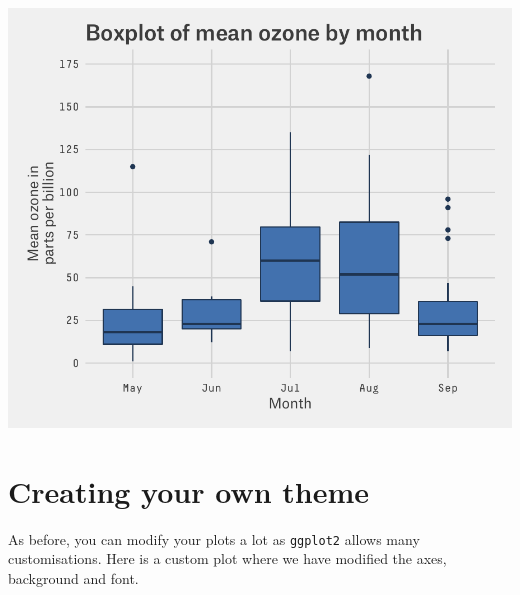 \documentclass[]{article}
\begin{document}
\begin{center}\includegraphics{10_Boxplots_pdf/box_13-1} \end{center}

\section{Creating your own theme}\label{creating-your-own-theme}

As before, you can modify your plots a lot as \texttt{ggplot2} allows
many customisations. Here is a custom plot where we have modified the
axes, background and font.
\end{document}
